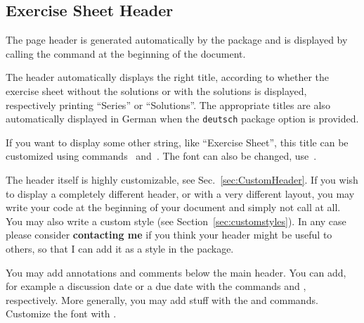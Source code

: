 \documentclass[11pt,a4paper]{article}
\begin{document}



\subsection{Exercise Sheet Header}
\label{sec:Header}

The page header is generated automatically by the package and is displayed by calling the
 command at the beginning of the document.


The header automatically displays the right title, according to whether the exercise sheet
without the solutions or with the solutions is displayed, respectively printing ``Series''
or ``Solutions''. The appropriate titles are also automatically displayed in German when
the \texttt{deutsch} package option is provided.

\begin{pkgtip}
  If you want to display some other string,
  like ``Exercise Sheet'', this title can be customized using
  commands~ and~. The
  font can also be changed, use~.
\end{pkgtip}

\begin{pkgtip}
  The header itself is highly customizable, see Sec.~\ref{sec:CustomHeader}. If you wish
  to display a completely different header, or with a very different layout, you may write
  your code at the beginning of your document and simply not call
   at all. You may also write a custom style (see
  Section~\ref{sec:customstyles}). In any case please consider \textbf{contacting me} if
  you think your header might be useful to others, so that I can add it as a style in the
  package.
\end{pkgtip}

You may add annotations and comments below the main header. You can add, for example a
discussion date or a due date with the commands  and
, respectively. More generally, you may add stuff with the
 and  commands. Customize the font
with .
\end{document}
